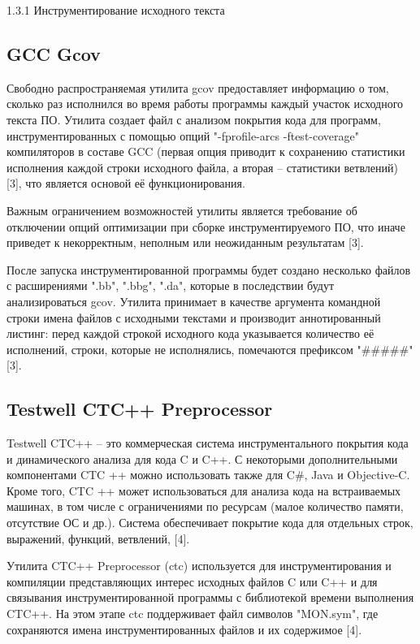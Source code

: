 1.3.1 Инструментирование исходного текста

\subsection{GCC Gcov}
Свободно распространяемая утилита gcov предоставляет информацию о том, сколько раз исполнился во время работы программы каждый участок исходного текста ПО. Утилита создает файл с анализом покрытия кода для программ, инструментированных с помощью опций "-fprofile-arcs -ftest-coverage" компиляторов в составе GCC (первая опция приводит к сохранению статистики исполнения каждой строки исходного файла, а вторая -- статистики ветвлений) [3], что является основой её функционирования.

Важным ограничением возможностей утилиты является требование об отключении опций оптимизации при сборке инструментируемого ПО, что иначе приведет к некорректным, неполным или неожиданным результатам [3].

После запуска инструментированной программы будет создано несколько файлов с расширениями ".bb", ".bbg", ".da", которые в последствии будут анализироваться gcov. Утилита принимает в качестве аргумента командной строки имена файлов с исходными текстами и производит аннотированный листинг: перед каждой строкой исходного кода указывается количество её исполнений, строки, которые не исполнялись, помечаются префиксом "\#\#\#\#\#" [3].

\subsection{Testwell CTC++ Preprocessor}
Testwell CTC++ -- это коммерческая система инструментального покрытия кода и динамического анализа для кода C и C++. С некоторыми дополнительными компонентами CTC ++ можно использовать также для C\#, Java и Objective-C. Кроме того, CTC ++ может использоваться для анализа кода на встраиваемых машинах, в том числе с ограничениями по ресурсам (малое количество памяти, отсутствие ОС и др.). Система обеспечивает покрытие кода для отдельных строк, выражений, функций, ветвлений, [4].

Утилита CTC++ Preprocessor (ctc) используется для инструментирования и компиляции представляющих интерес исходных файлов C или C++ и для связывания инструментированной программы с библиотекой времени выполнения CTC++. На этом этапе ctc поддерживает файл символов "MON.sym", где сохраняются имена инструментированных файлов и их содержимое [4].

